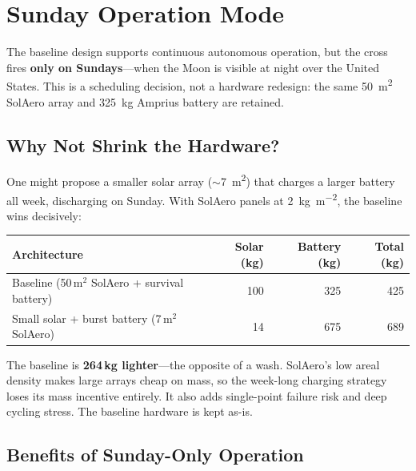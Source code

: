 \documentclass[12pt,letterpaper]{article}
\begin{document}
\section{Sunday Operation Mode}

The baseline design supports continuous autonomous operation, but the cross
fires \textbf{only on Sundays}---when the Moon is visible at night over the
United States. This is a scheduling decision, not a hardware redesign: the
same \SI{50}{\meter\squared} SolAero array and \SI{325}{\kilo\gram} Amprius
battery are retained.

\subsection{Why Not Shrink the Hardware?}

One might propose a smaller solar array ($\sim$\SI{7}{\meter\squared}) that
charges a larger battery all week, discharging on Sunday. With SolAero panels
at \SI{2}{\kilo\gram\per\meter\squared}, the baseline wins decisively:

\begin{center}
\begin{tabular}{lrrr}
\toprule
\textbf{Architecture} & \textbf{Solar (kg)} & \textbf{Battery (kg)} & \textbf{Total (kg)} \\
\midrule
Baseline (50\,m$^2$ SolAero + survival battery) & 100 & 325 & 425 \\
Small solar + burst battery (7\,m$^2$ SolAero) & 14 & 675 & 689 \\
\bottomrule
\end{tabular}
\end{center}

\noindent The baseline is \textbf{264\,kg lighter}---the opposite of a wash.
SolAero's low areal density makes large arrays cheap on mass, so the
week-long charging strategy loses its mass incentive entirely. It also adds
single-point failure risk and deep cycling stress. The baseline hardware is
kept as-is.

\subsection{Benefits of Sunday-Only Operation}
\end{document}
